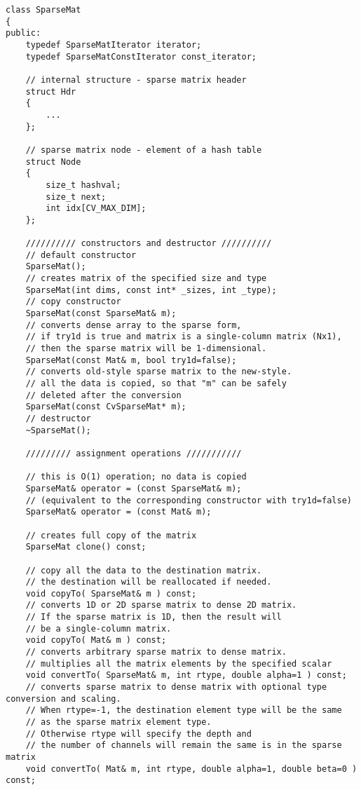 \begin{lstlisting}
class SparseMat
{
public:
    typedef SparseMatIterator iterator;
    typedef SparseMatConstIterator const_iterator;

    // internal structure - sparse matrix header
    struct Hdr
    {
        ...
    };

    // sparse matrix node - element of a hash table
    struct Node
    {
        size_t hashval;
        size_t next;
        int idx[CV_MAX_DIM];
    };

    ////////// constructors and destructor //////////
    // default constructor
    SparseMat();
    // creates matrix of the specified size and type
    SparseMat(int dims, const int* _sizes, int _type);
    // copy constructor
    SparseMat(const SparseMat& m);
    // converts dense array to the sparse form,
    // if try1d is true and matrix is a single-column matrix (Nx1),
    // then the sparse matrix will be 1-dimensional.
    SparseMat(const Mat& m, bool try1d=false);
    // converts old-style sparse matrix to the new-style.
    // all the data is copied, so that "m" can be safely
    // deleted after the conversion
    SparseMat(const CvSparseMat* m);
    // destructor
    ~SparseMat();
    
    ///////// assignment operations /////////// 
    
    // this is O(1) operation; no data is copied
    SparseMat& operator = (const SparseMat& m);
    // (equivalent to the corresponding constructor with try1d=false)
    SparseMat& operator = (const Mat& m);

    // creates full copy of the matrix
    SparseMat clone() const;
    
    // copy all the data to the destination matrix.
    // the destination will be reallocated if needed.
    void copyTo( SparseMat& m ) const;
    // converts 1D or 2D sparse matrix to dense 2D matrix.
    // If the sparse matrix is 1D, then the result will
    // be a single-column matrix.
    void copyTo( Mat& m ) const;
    // converts arbitrary sparse matrix to dense matrix.
    // multiplies all the matrix elements by the specified scalar
    void convertTo( SparseMat& m, int rtype, double alpha=1 ) const;
    // converts sparse matrix to dense matrix with optional type conversion and scaling.
    // When rtype=-1, the destination element type will be the same
    // as the sparse matrix element type.
    // Otherwise rtype will specify the depth and
    // the number of channels will remain the same is in the sparse matrix
    void convertTo( Mat& m, int rtype, double alpha=1, double beta=0 ) const;


\end{lstlisting}
